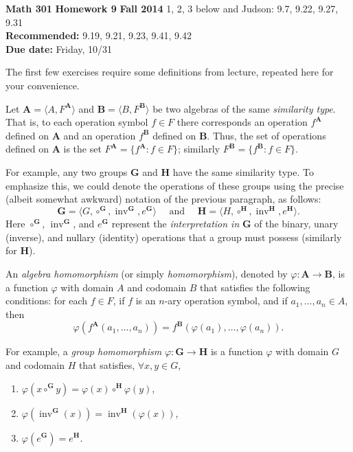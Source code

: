 \documentclass[12pt,reqno]{amsart}
\newcommand{\bA}{\ensuremath{\mathbf{A}}}
\newcommand{\bB}{\ensuremath{\mathbf{B}}}
\newcommand{\bG}{\ensuremath{\mathbf{G}}}
\newcommand{\bH}{\ensuremath{\mathbf{H}}}
\newcommand{\invG}{\ensuremath{\operatorname{inv}^{\bG}}}
\newcommand{\invH}{\ensuremath{\operatorname{inv}^{\bH}}}
\newcommand{\<}{\ensuremath{\langle}}
\renewcommand{\>}{\ensuremath{\rangle}}
\begin{document}
\thispagestyle{empty}

\noindent \textbf{Math 301} \hskip5cm {\bf Homework 9} \hfill {\bf Fall 2014}
\vskip1cm
 1, 2, 3 below and Judson: 9.7, 9.22, 9.27, 9.31\\
{\bf Recommended:} 9.19, 9.21, 9.23, 9.41, 9.42\\
{\bf Due date:} Friday, 10/31

\bigskip

\noindent The first few exercises require some definitions from lecture, 
repeated here for your convenience.

\vskip5mm

\noindent Let $\bA = \<A, F^{\bA}\>$ and $\bB = \<B, F^{\bB}\>$ be two algebras of the
same \emph{similarity type}.  That is, to each operation
symbol $f \in F$ there corresponds an operation $f^{\bA}$ defined on $\bA$ and an
operation $f^{\bB}$ defined on $\bB$.
Thus, the set of operations defined on $\bA$ is the set 
$F^{\bA} = \{f^{\bA} : f\in F\}$; similarly 
$F^{\bB} = \{f^{\bB} : f\in F\}$.

\vskip3mm

\noindent For example, any two groups $\bG$ and $\bH$ have the same similarity type. 
To emphasize this, we could denote the operations of these groups using
the precise (albeit somewhat awkward) notation of the previous paragraph, as follows:
\[
\bG  = \<G, \circ^{\bG}, \invG, e^{\bG}\> \quad \text{ and } \quad
\bH  = \<H, \circ^{\bH}, \invH, e^{\bH}\>.
\] 
Here $\circ^{\bG}$, $\invG$, and $e^{\bG}$ represent the \emph{interpretation
in} $\bG$ of the binary, unary (inverse), and  nullary (identity)
operations that a group must possess (similarly for $\bH$).  

\vskip5mm

\noindent An \emph{algebra homomorphism} (or simply \emph{homomorphism}), denoted by
$\varphi: \bA \rightarrow \bB$, is a function $\varphi$ with domain $A$ and
codomain $B$ that satisfies the following conditions: for each $f \in F$, if $f$
is an $n$-ary operation symbol, and if $a_1, \dots, a_n \in A$, then
\[
\varphi(f^{\bA}(a_1, \dots, a_n)) = f^{\bB}(\varphi(a_1), \dots, \varphi(a_n)).
\]

\vskip3mm

\noindent For example, a \emph{group homomorphism} $\varphi: \bG \rightarrow \bH$  is a function 
$\varphi$ with domain $G$ and codomain $H$ that satisfies, $\forall x, y \in G$,
\begin{enumerate}
\item  $\varphi(x\circ^{\bG} y) = \varphi(x) \circ^{\bH} \varphi(y)$,
\item  $\varphi(\invG(x)) = \invH(\varphi(x))$,
\item  $\varphi(e^{\bG}) = e^{\bH}$.
\end{enumerate}
\end{document}
